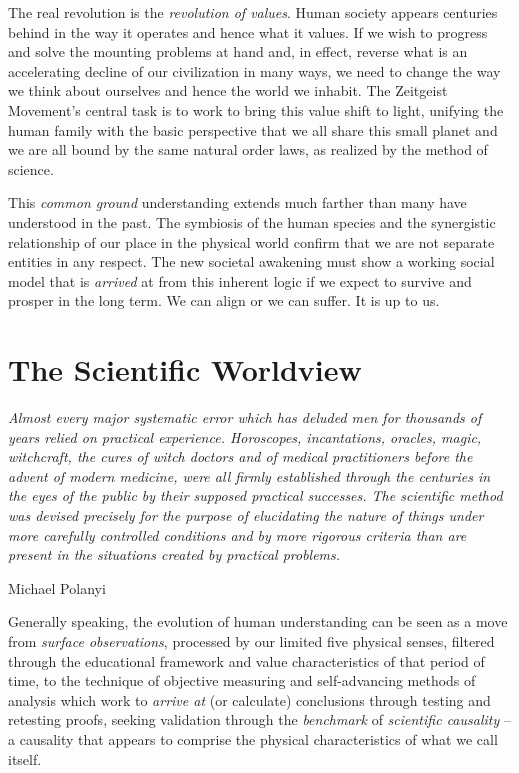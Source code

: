 \documentclass[10pt, a4paper, cleardoubleempty, openright, twoside]{book}
\begin{document}
The real revolution is the \emph{revolution of values}. Human society
appears centuries behind in the way it operates and hence what it
values. If we wish to progress and solve the mounting problems at hand
and, in effect, reverse what is an accelerating decline of our
civilization in many ways, we need to change the way we think about
ourselves and hence the world we inhabit. The Zeitgeist Movement's
central task is to work to bring this value shift to light, unifying the
human family with the basic perspective that we all share this small
planet and we are all bound by the same natural order laws, as realized
by the method of science.

This \emph{common ground} understanding extends much farther than many
have understood in the past. The symbiosis of the human species and the
synergistic relationship of our place in the physical world confirm that
we are not separate entities in any respect. The new societal awakening
must show a working social model that is \emph{arrived} at from this
inherent logic if we expect to survive and prosper in the long term. We
can align or we can suffer. It is up to us.

\chapter {The Scientific Worldview}
\epigraph{\itshape
	Almost every major systematic error which has deluded men for
	thousands of years relied on practical experience. Horoscopes,
	incantations, oracles, magic, witchcraft, the cures of witch doctors
	and of medical practitioners before the advent of modern medicine,
	were all firmly established through the centuries in the eyes of the
	public by their supposed practical successes. The scientific method
	was devised precisely for the purpose of elucidating the nature of
	things under more carefully controlled conditions and by more rigorous
	criteria than are present in the situations created by practical
	problems.
}{Michael Polanyi~\cite[p.~183]{Polanyi::62}}

Generally speaking, the evolution of human understanding can be seen as
a move from \emph{surface observations}, processed by our limited five
physical senses,  filtered through the
educational framework and value characteristics of that period of time,
to the technique of objective measuring and self-advancing methods of
analysis which work to \emph{arrive at} (or calculate) conclusions
through testing and retesting proofs, seeking validation through the
\emph{benchmark} of \emph{scientific causality} -- a causality that
appears to comprise the physical characteristics of what we call
 itself.
\end{document}
